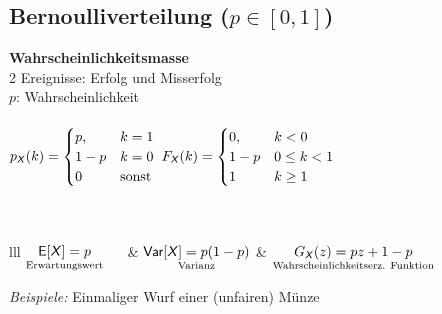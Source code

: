 \documentclass[german,color,6pt]{latex4ei/latex4ei_sheet}
\begin{document}
\begin{sectionbox}
	\subsection{Bernoulliverteilung ($p \in [0,1]$)} 
	\textbf{Wahrscheinlichkeitsmasse} \\
	2 Ereignisse: Erfolg und Misserfolg\\
	$p$: Wahrscheinlichkeit  \\ \\ 
	$p_{\operatorname{\textsf{\textit{X}}}}(k) = \begin{cases}
	p, & k = 1 \\
	1-p & k = 0 \\
	0 & \text{sonst}\\
	\end{cases}$ \qquad\quad
	$F_{\operatorname{\textsf{\textit{X}}}}(k) = \begin{cases}
	0, & k < 0 \\
	1-p & 0 \le k < 1 \\
	1 & k \ge 1\\
	\end{cases}$					
	\\ \\  \\ 
	\everymath{\displaystyle}
	\begin{tablebox}{lll}
		$\underset{\text{Erwartungswert}}{\E[\X] = p}\quad\ $ & $\underset{\text{Varianz}}{\operatorname{\textsf{Var}}[\operatorname{\textsf{\textit{X}}}] = p (1-p)}$ & $\underset{\text{Wahrscheinlichkeitserz. Funktion}}{G_{\operatorname{\textsf{\textit{X}}}} (z) = pz + 1 -p}$
	\end{tablebox}
	\emph{Beispiele:} Einmaliger Wurf einer (unfairen) Münze
\end{sectionbox}
\end{document}
